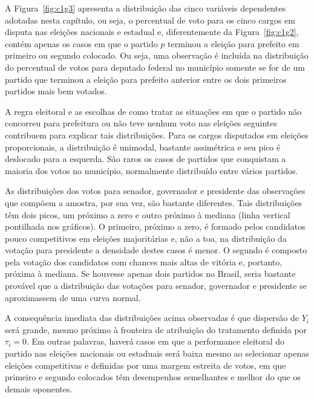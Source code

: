 A Figura~\ref{fig:c1g3} apresenta a distribuição das cinco variáveis dependentes adotadas nesta capítulo, ou seja, o percentual de voto para os cinco cargos em disputa nas eleições nacionais e estadual e, diferentemente da Figura~\ref{fig:c1g2}, contém apenas os casos em que o partido $p$ terminou a eleição para prefeito em primeiro ou segundo colocado. Ou seja, uma observação é incluída na distribuição do percentual de votos para deputado federal no município somente se for de um partido que terminou a eleição para prefeito anterior entre os dois primeiros partidos mais bem votados.

A regra eleitoral e as escolhas de como tratar as situações em que o partido não concorreu para prefeitura ou não teve nenhum voto nas eleições seguintes contribuem para explicar tais distribuições. Para os cargos disputados em eleições proporcionais, a distribuição é unimodal, bastante assimétrica e seu pico é deslocado para a esquerda. São raros os casos de partidos que conquistam a maioria dos votos no município, normalmente distribuído entre vários partidos.

As distribuições dos votos para senador, governador e presidente das observações que compõem a amostra, por sua vez, são bastante diferentes. Tais distribuições têm dois picos, um próximo a zero e outro próximo à mediana (linha vertical pontilhada nos gráficos). O primeiro, próximo a zero, é formado pelos candidatos pouco competitivos em eleições majoritárias e, não a toa, na distribuição da votação para presidente a densidade destes casos é menor. O segundo é composto pela votação dos candidatos com chances mais altas de vitória e, portanto, próxima à mediana. Se houvesse apenas dois partidos no Brasil, seria bastante provável que a distribuição das votações para senador, governador e presidente se aproximassem de uma curva normal.

A consequência imediata das distribuições acima observadas é que dispersão de $Y_{i}$ será grande, mesmo próximo à fronteira de atribuição do tratamento definida por $\tau_{i}=0$. Em outras palavras, haverá casos em que a performance eleitoral do partido nas eleições nacionais ou estaduais será baixa mesmo ao selecionar apenas eleições competitivas e definidas por uma margem estreita de votos, em que primeiro e segundo colocados têm desempenhos semelhantes e melhor do que os demais oponentes.

